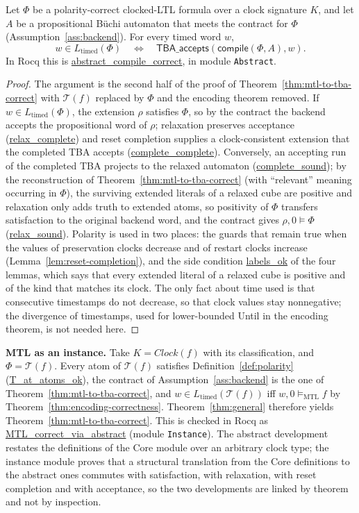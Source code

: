 \documentclass[manuscript]{acmart}
\newcommand{\satM}{\models_{\mathrm{MTL}}}
\newcommand{\T}{\mathcal{T}}
\newcommand{\Clock}{\mathit{Clock}}
\newcommand{\runinhead}[1]{\par\noindent\textbf{#1}\enspace}
\newcommand{\Rocqid}[1]{\url{#1}}
\begin{document}
\begin{theorem}
\label{thm:general}
Let $\Phi$ be a polarity-correct clocked-LTL formula over a clock signature
$K$, and let $A$ be a propositional B\"uchi automaton that meets the contract
for $\Phi$ (Assumption~\ref{ass:backend}). For every timed word $w$,
\[
w\in L_{\mathrm{timed}}(\Phi)
\quad\Longleftrightarrow\quad
\mathsf{TBA\_accepts}(\mathsf{compile}(\Phi,A),w).
\]
In Rocq this is \Rocqid{abstract_compile_correct}, in module \texttt{Abstract}.
\end{theorem}
\begin{proof}
The argument is the second half of the proof of
Theorem~\ref{thm:mtl-to-tba-correct} with $\T(f)$ replaced by $\Phi$ and the
encoding theorem removed. If $w\in L_{\mathrm{timed}}(\Phi)$, the extension
$\rho$ satisfies $\Phi$, so by the contract the backend accepts the
propositional word of $\rho$; relaxation preserves acceptance
(\Rocqid{relax_complete}) and reset completion supplies a clock-consistent
extension that the completed TBA accepts (\Rocqid{complete_complete}). Conversely, an
accepting run of the completed TBA projects to the relaxed automaton
(\Rocqid{complete_sound}); by the reconstruction of
Theorem~\ref{thm:mtl-to-tba-correct} (with ``relevant'' meaning occurring in
$\Phi$), the surviving extended literals of a relaxed cube are positive and
relaxation only adds truth to extended atoms, so positivity of $\Phi$ transfers satisfaction to the original backend
word, and the contract gives $\rho,0\models\Phi$ (\Rocqid{relax_sound}).
Polarity is used in two places: the guards that remain true when the values of
preservation clocks decrease and of restart clocks increase (Lemma~\ref{lem:reset-completion}),
and the side condition \Rocqid{labels_ok} of the four lemmas, which says that
every extended literal of a relaxed cube is positive and of the kind that
matches its clock. The only fact about time used is that consecutive timestamps
do not decrease, so that clock values stay nonnegative; the divergence of
timestamps, used for lower-bounded Until in the encoding theorem, is not needed
here.
\end{proof}

\runinhead{MTL as an instance.}
Take $K=\Clock(f)$ with its classification, and $\Phi=\T(f)$. Every atom of
$\T(f)$ satisfies Definition~\ref{def:polarity}
(\Rocqid{T_at_atoms_ok}), the contract of Assumption~\ref{ass:backend} is the
one of Theorem~\ref{thm:mtl-to-tba-correct}, and
$w\in L_{\mathrm{timed}}(\T(f))$ iff $w,0\satM f$ by
Theorem~\ref{thm:encoding-correctness}. Theorem~\ref{thm:general} therefore
yields Theorem~\ref{thm:mtl-to-tba-correct}. This is checked in Rocq as
\Rocqid{MTL_correct_via_abstract} (module \texttt{Instance}). The abstract
development restates the definitions of the Core module over an arbitrary clock
type; the instance module proves that a structural translation from the Core
definitions to the abstract ones commutes with satisfaction, with relaxation,
with reset completion and with acceptance, so the two developments are linked
by theorem and not by inspection.
\end{document}
